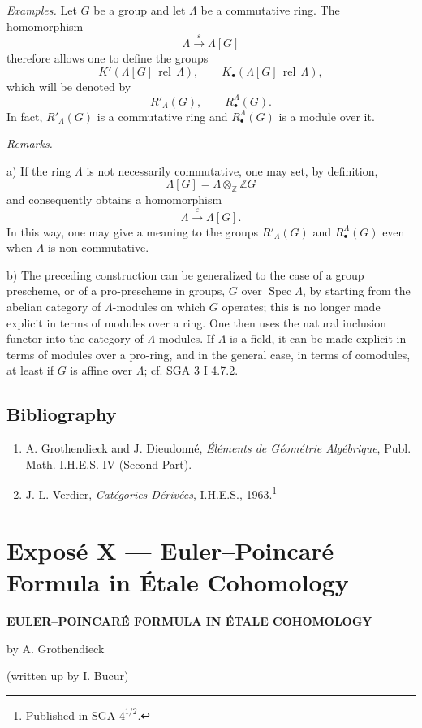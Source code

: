 \documentclass[11pt]{article}
\DeclareMathOperator{\Spec}{Spec}
\providecommand{\Spec}{\operatorname{Spec}}
\providecommand{\Spec}{\operatorname{Spec}}
\providecommand{\Spec}{\operatorname{Spec}}
\providecommand{\Spec}{\operatorname{Spec}}
\begin{document}
\emph{Examples.} Let $G$ be a group and let $\Lambda$ be a commutative ring. The homomorphism
\[
\Lambda\xrightarrow{\varepsilon}\Lambda[G]
\]
therefore allows one to define the groups
\[
K'(\Lambda[G]\operatorname{\,rel\,}\Lambda),\qquad
K_\bullet(\Lambda[G]\operatorname{\,rel\,}\Lambda),
\]
which will be denoted by
\[
R'_\Lambda(G),\qquad R^\Lambda_\bullet(G).
\]
In fact, $R'_\Lambda(G)$ is a commutative ring and $R^\Lambda_\bullet(G)$ is a module over it.

\emph{Remarks.}

a) If the ring $\Lambda$ is not necessarily commutative, one may set, by definition,
\[
\Lambda[G]=\Lambda\otimes_{\mathbb Z}\mathbb ZG
\]
and consequently obtains a homomorphism
\[
\Lambda\xrightarrow{\varepsilon}\Lambda[G].
\]
In this way, one may give a meaning to the groups $R'_\Lambda(G)$ and $R^\Lambda_\bullet(G)$ even when $\Lambda$ is non-commutative.

b) The preceding construction can be generalized to the case of a group prescheme, or of a pro-prescheme in groups, $G$ over $\Spec\Lambda$, by starting from the abelian category of $\Lambda$-modules on which $G$ operates; this is no longer made explicit in terms of modules over a ring. One then uses the natural inclusion functor into the category of $\Lambda$-modules. If $\Lambda$ is a field, it can be made explicit in terms of modules over a pro-ring, and in the general case, in terms of comodules, at least if $G$ is affine over $\Lambda$; cf. SGA 3 I 4.7.2.

\subsection*{Bibliography}

\begin{enumerate}
\item[{[1]}] A. Grothendieck and J. Dieudonné, \emph{Éléments de Géométrie Algébrique}, Publ. Math. I.H.E.S. IV (Second Part).
\item[{[2]}] J. L. Verdier, \emph{Catégories Dérivées}, I.H.E.S., 1963.\footnote{Published in SGA $4^{1/2}$.}
\end{enumerate}

\section*{Exposé X --- Euler--Poincaré Formula in Étale Cohomology}

\begin{center}
\textbf{EULER--POINCARÉ FORMULA IN ÉTALE COHOMOLOGY}

by A. Grothendieck

(written up by I. Bucur)
\end{center}
\end{document}
